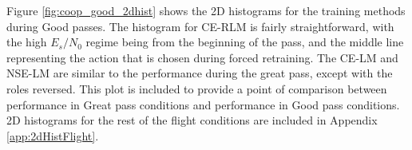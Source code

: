 	


\par Figure \ref{fig:coop_good_2dhist} shows the 2D histograms for the training methods during Good passes. The histogram for CE-RLM is fairly straightforward, with the high $E_s/N_0$ regime being from the beginning of the pass, and the middle line representing the action that is chosen during forced retraining. The CE-LM and NSE-LM are similar to the performance during the great pass, except with the roles reversed. This plot is included to provide a point of comparison between performance in Great pass conditions and performance in Good pass conditions. 2D histograms for the rest of the flight conditions are included in Appendix \ref{app:2dHistFlight}.


